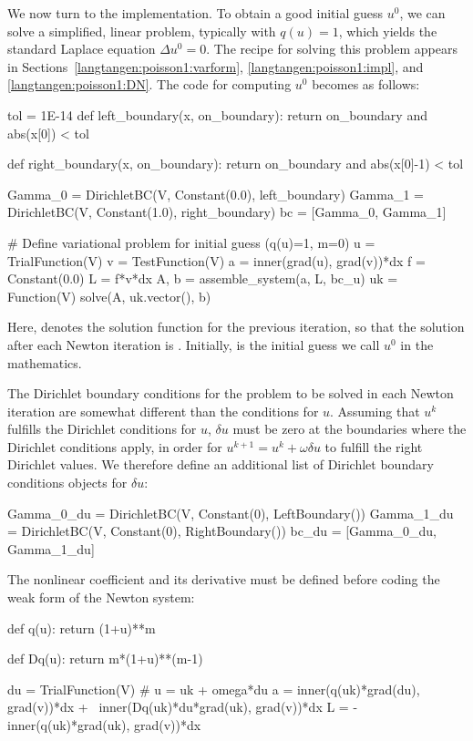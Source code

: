 We now turn to the implementation.
To obtain a good initial guess $u^0$, we can solve a simplified, linear
problem, typically with $q(u)=1$, which yields the standard Laplace
equation $\Delta u^0 =0$. The recipe for solving this problem
appears in Sections~\ref{langtangen:poisson1:varform},
\ref{langtangen:poisson1:impl}, and \ref{langtangen:poisson1:DN}.
The code for computing $u^0$ becomes as follows:
\begin{python}
tol = 1E-14
def left_boundary(x, on_boundary):
    return on_boundary and abs(x[0]) < tol

def right_boundary(x, on_boundary):
    return on_boundary and abs(x[0]-1) < tol

Gamma_0 = DirichletBC(V, Constant(0.0), left_boundary)
Gamma_1 = DirichletBC(V, Constant(1.0), right_boundary)
bc = [Gamma_0, Gamma_1]

# Define variational problem for initial guess (q(u)=1, m=0)
u = TrialFunction(V)
v = TestFunction(V)
a = inner(grad(u), grad(v))*dx
f = Constant(0.0)
L = f*v*dx
A, b = assemble_system(a, L, bc_u)
uk = Function(V)
solve(A, uk.vector(), b)
\end{python}
Here,  denotes the solution function for the previous
iteration, so that the solution
after each Newton iteration is .
Initially,  is the initial guess we call $u^0$ in the mathematics.

The Dirichlet boundary conditions for the problem to be solved in each Newton
iteration are somewhat different than the conditions for $u$.
Assuming that $u^k$ fulfills the
Dirichlet conditions for $u$, $\delta u$ must be zero at the boundaries
where the Dirichlet conditions apply, in order for $u^{k+1}=u^k + \omega\delta u$ to fulfill
the right Dirichlet values. We therefore define an additional list of
Dirichlet boundary conditions objects for $\delta u$:
\begin{python}
Gamma_0_du = DirichletBC(V, Constant(0), LeftBoundary())
Gamma_1_du = DirichletBC(V, Constant(0), RightBoundary())
bc_du = [Gamma_0_du, Gamma_1_du]
\end{python}
The nonlinear coefficient and its derivative must be defined
before coding the weak form of the Newton system:
\begin{python}
def q(u):
    return (1+u)**m

def Dq(u):
    return m*(1+u)**(m-1)

du = TrialFunction(V) # u = uk + omega*du
a = inner(q(uk)*grad(du), grad(v))*dx + \
    inner(Dq(uk)*du*grad(uk), grad(v))*dx
L = -inner(q(uk)*grad(uk), grad(v))*dx
\end{python}

